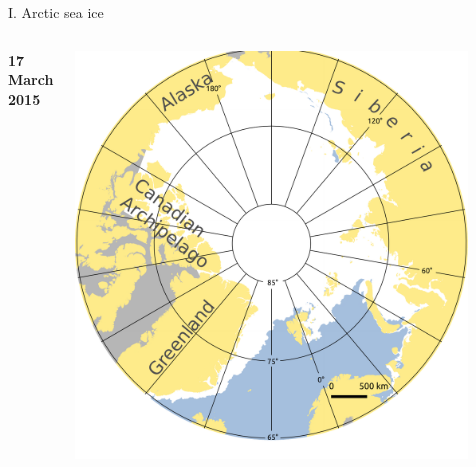 \documentclass[8pt]{beamer}
\begin{document}
\setwatermark{\fontsize{125pt}{125pt}\selectfont{}}
\begin{frame}[fragile]{I. Arctic sea ice}
	\begin{columns}
			\begin{center}
				\textbf{17 March 2015}
			\end{center}
			\includegraphics[width=0.9\textwidth]{./img/ArcticSI_Mar2015_SI_noLeg_names.pdf}\\
			

\end{columns}
\end{frame}
\end{document}

